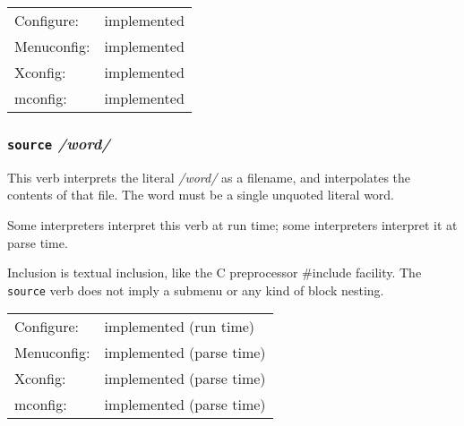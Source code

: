 \begin{tabular}{ll}
Configure:  &implemented\\
Menuconfig: &implemented\\
Xconfig:    &implemented\\
mconfig:    &implemented\\
\end{tabular}



\subsubsection{\texttt{source} \quad\textit{/word/}}

This verb interprets the literal \textit{/word/} as a filename, and interpolates
the contents of that file.  The word must be a single unquoted literal
word.

Some interpreters interpret this verb at run time; some interpreters
interpret it at parse time.

Inclusion is textual inclusion, like the C preprocessor \#include facility.
The \texttt{source} verb does not imply a submenu or any kind of block nesting.

\begin{tabular}{ll}
Configure:  &implemented (run time)\\
Menuconfig: &implemented (parse time)\\
Xconfig:    &implemented (parse time)\\
mconfig:    &implemented (parse time)\\
\end{tabular}

